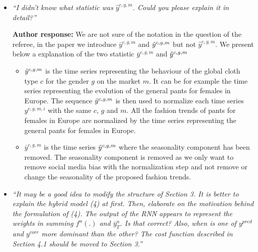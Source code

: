 \documentclass[10pt]{article} %
\begin{document}
\begin{itemize}
	\item {\em ``I didn't know what statistic was $\hat{y}^{c,g,m}$. Could you please explain it in detail?''} \medskip

	\textbf{Author response:} We are not sure of the notation in the question of the referee, in the paper we introduce $\bar{y}^{c,g,m}$ and $\Tilde{y}^{c,g,m}$ but not $\hat{y}^{c,g,m}$. We present below a explanation of the two statistic $\bar{y}^{c,g,m}$ and $\Tilde{y}^{c,g,m}$
	\begin{itemize}
	\item $\Tilde{y}^{c,g,m}$ is the time series representing the behaviour of the global cloth type $c$ for the gender $g$ on the market $m$. It can be for example the time series representing the evolution of the general pants for females in Europe. The sequence $\Tilde{y}^{c,g,m}$ is then used to normalize each time series $y^{c,g,m,i}$ with the same $c$, $g$ and $m$. All the fashion trends of pants for females in Europe are normalized by the time series representing the general pants for females in Europe.
	\item $\bar{y}^{c,g,m}$ is the time series $\Tilde{y}^{c,g,m}$ where the seasonality component has been removed. The seasonality component is removed as we only want to remove social media bias with the normalization step and not remove or change the seasonality of the proposed fashion trends.
	\end{itemize}	

	\item {\em ``It may be a good idea to modify the structure of Section 3. It is better to explain the hybrid model (4) at first.  Then, elaborate on the motivation behind the formulation of (4). The output of the RNN appears to represent the weights in summing $f^n(.)$ and $\bar{y}^n_{T}$. Is that correct? Also, when is one of $y^{pred}$ and $y^{corr}$ more dominant than the other? The cost function described in Section 4.1 should be moved to Section 3.''} \medskip


\end{itemize}
\end{document}
